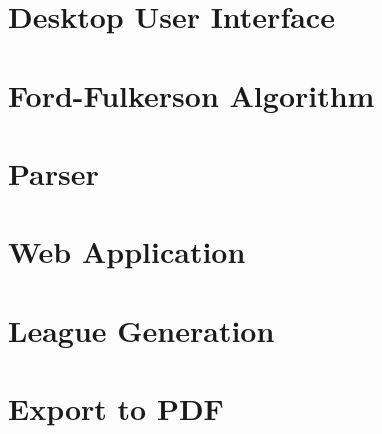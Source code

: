 \section{Desktop User Interface}


\newpage

\section{Ford-Fulkerson Algorithm}
\label{sec:fordFulkersonAlgorithm}


\newpage

\section{Parser}


\newpage

\section{Web Application}


\newpage

\section{League Generation}


\newpage

\section{Export to PDF}

